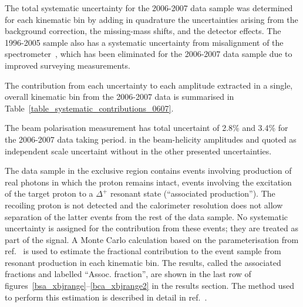 The total systematic uncertainty for the 2006-2007 data sample was
determined for each kinematic bin by adding in quadrature the
  uncertainties arising from the background correction, the
  missing-mass shifts, and the detector effects.  The 1996-2005 sample also has a
systematic uncertainty from misalignment of the spectrometer~\cite{Air09}, which has been eliminated for the 2006-2007 data sample due to improved
  surveying measurements. 

The contribution from each uncertainty to each amplitude extracted in a single, overall kinematic bin from the 2006-2007 data  is summarised in Table~\ref{table_systematic_contributions_0607}.

The beam polarisation measurement has total uncertaint of 2.8\%  and 3.4\% for the 2006-2007 data taking period.  in the beam-helicity amplitudes and  quoted as independent scale uncertaint without  in the other presented uncertainties.

The data sample in the exclusive region contains events  involving production of real photons in which the proton remains intact, 
events involving the excitation of the target proton to a $\Delta^+$
resonant state (``associated production''). The recoiling proton is not detected and the calorimeter resolution does not allow separation of  the latter events from the rest of the data sample.
No systematic uncertainty is assigned for the contribution from these
events; they are treated as part of the signal. A Monte Carlo
calculation based on the parameterisation from ref.~\cite{Bra76} is
used to estimate the fractional contribution to the event sample from resonant
production in each kinematic bin. The results, called the associated fractions and labelled ``Assoc. fraction'', are shown in the last row of figures~\ref{bsa_xbjrange}--\ref{bca_xbjrange2} in the results section. The method used to perform this estimation is described in detail in
ref.~\cite{Air08}.

